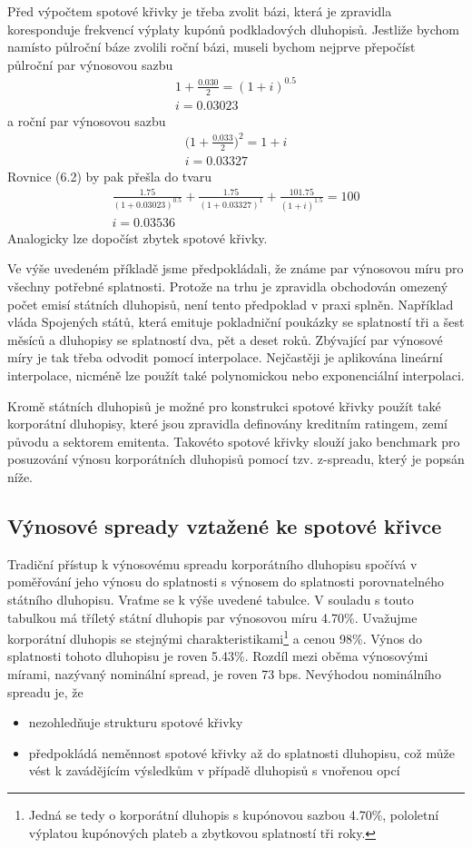 \documentclass[a4paper]{book}
\begin{document}
Před výpočtem spotové křivky je třeba zvolit bázi, která je zpravidla koresponduje frekvencí výplaty kupónů podkladových dluhopisů. Jestliže bychom namísto půlroční báze zvolili roční bázi, museli bychom nejprve přepočíst půlroční par výnosovou sazbu
\begin{gather*}
1 + \frac{0.030}{2} = (1 + i)^{0.5} \\
i = 0.03023
\end{gather*}
a roční par výnosovou sazbu
\begin{gather*}
\Bigg(1 + \frac{0.033}{2}\Bigg)^2 = 1 + i \\
i = 0.03327
\end{gather*}
Rovnice (6.2) by pak přešla do tvaru
\begin{gather*}
\frac{1.75}{(1 + 0.03023)^{0.5}} + \frac{1.75}{(1 + 0.03327)^1} + \frac{101.75}{(1 + i)^{1.5}} = 100 \\
i = 0.03536
\end{gather*}
Analogicky lze dopočíst zbytek spotové křivky.

Ve výše uvedeném příkladě jsme předpokládali, že známe par výnosovou míru pro všechny potřebné splatnosti. Protože na trhu je zpravidla obchodován omezený počet emisí státních dluhopisů, není tento předpoklad v praxi splněn. Například vláda Spojených států, která emituje pokladniční poukázky se splatností tři a šest měsíců a dluhopisy se splatností dva, pět a deset roků. Zbývající par výnosové míry je tak třeba odvodit pomocí interpolace. Nejčastěji je aplikována lineární interpolace, nicméně lze použít také polynomickou nebo exponenciální interpolaci.

Kromě státních dluhopisů je možné pro konstrukci spotové křivky použít také korporátní dluhopisy, které jsou zpravidla definovány kreditním ratingem, zemí původu a sektorem emitenta. Takovéto spotové křivky slouží jako benchmark pro posuzování výnosu korporátních dluhopisů pomocí tzv. z-spreadu, který je popsán níže.

\subsection{Výnosové spready vztažené ke spotové křivce}

Tradiční přístup k výnosovému spreadu korporátního dluhopisu spočívá v poměřování jeho výnosu do splatnosti s výnosem do splatnosti porovnatelného státního dluhopisu. Vraťme se k výše uvedené tabulce. V souladu s touto tabulkou má tříletý státní dluhopis par výnosovou míru 4.70\%. Uvažujme korporátní dluhopis se stejnými charakteristikami\footnote{Jedná se tedy o korporátní dluhopis s kupónovou sazbou 4.70\%, pololetní výplatou kupónových plateb a zbytkovou splatností tři roky.} a cenou 98\%. Výnos do splatnosti tohoto dluhopisu je roven 5.43\%. Rozdíl mezi oběma výnosovými mírami, nazývaný nominální spread, je roven 73 bps. Nevýhodou nominálního spreadu je, že
\begin{itemize}
\item nezohledňuje strukturu spotové křivky
\item předpokládá neměnnost spotové křivky až do splatnosti dluhopisu, což může vést k zavádějícím výsledkům v případě dluhopisů s vnořenou opcí
\end{itemize}
\end{document}
